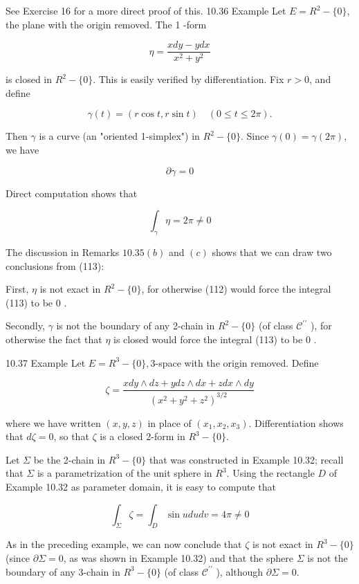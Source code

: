 \documentclass[10pt]{article}
\begin{document}
See Exercise 16 for a more direct proof of this. 10.36 Example Let $E=R^{2}-\{0\}$, the plane with the origin removed. The 1 -form

$$
\eta=\frac{x d y-y d x}{x^{2}+y^{2}}
$$

is closed in $R^{2}-\{0\}$. This is easily verified by differentiation. Fix $r>0$, and define

$$
\gamma(t)=(r \cos t, r \sin t) \quad(0 \leq t \leq 2 \pi) .
$$

Then $\gamma$ is a curve (an "oriented 1-simplex") in $R^{2}-\{0\}$. Since $\gamma(0)=\gamma(2 \pi)$, we have

$$
\partial \gamma=0
$$

Direct computation shows that

$$
\int_{\gamma} \eta=2 \pi \neq 0
$$

The discussion in Remarks $10.35(b)$ and $(c)$ shows that we can draw two conclusions from (113):

First, $\eta$ is not exact in $R^{2}-\{0\}$, for otherwise (112) would force the integral (113) to be 0 .

Secondly, $\gamma$ is not the boundary of any 2-chain in $R^{2}-\{0\}$ (of class $\mathscr{C}^{\prime \prime}$ ), for otherwise the fact that $\eta$ is closed would force the integral (113) to be 0 .

10.37 Example Let $E=R^{3}-\{0\}, 3$-space with the origin removed. Define

$$
\zeta=\frac{x d y \wedge d z+y d z \wedge d x+z d x \wedge d y}{\left(x^{2}+y^{2}+z^{2}\right)^{3 / 2}}
$$

where we have written $(x, y, z)$ in place of $\left(x_{1}, x_{2}, x_{3}\right)$. Differentiation shows that $d \zeta=0$, so that $\zeta$ is a closed 2-form in $R^{3}-\{0\}$.

Let $\Sigma$ be the 2-chain in $R^{3}-\{0\}$ that was constructed in Example 10.32; recall that $\Sigma$ is a parametrization of the unit sphere in $R^{3}$. Using the rectangle $D$ of Example 10.32 as parameter domain, it is easy to compute that

$$
\int_{\Sigma} \zeta=\int_{D} \sin u d u d v=4 \pi \neq 0
$$

As in the preceding example, we can now conclude that $\zeta$ is not exact in $R^{3}-\{0\}$ (since $\partial \Sigma=0$, as was shown in Example 10.32) and that the sphere $\Sigma$ is not the boundary of any 3-chain in $R^{3}-\{0\}$ (of class $\mathscr{C}^{\prime \prime}$ ), although $\partial \Sigma=0$.
\end{document}
